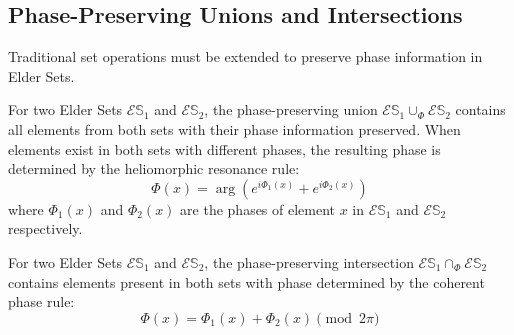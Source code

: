 \subsection{Phase-Preserving Unions and Intersections}

Traditional set operations must be extended to preserve phase information in Elder Sets.

\begin{definition}
For two Elder Sets $\mathcal{E}\mathbb{S}_1$ and $\mathcal{E}\mathbb{S}_2$, the phase-preserving union $\mathcal{E}\mathbb{S}_1 \cup_{\Phi} \mathcal{E}\mathbb{S}_2$ contains all elements from both sets with their phase information preserved. When elements exist in both sets with different phases, the resulting phase is determined by the heliomorphic resonance rule:
\begin{equation}
\Phi(x) = \arg\left(e^{i\Phi_1(x)} + e^{i\Phi_2(x)}\right)
\end{equation}
where $\Phi_1(x)$ and $\Phi_2(x)$ are the phases of element $x$ in $\mathcal{E}\mathbb{S}_1$ and $\mathcal{E}\mathbb{S}_2$ respectively.
\end{definition}

\begin{definition}
For two Elder Sets $\mathcal{E}\mathbb{S}_1$ and $\mathcal{E}\mathbb{S}_2$, the phase-preserving intersection $\mathcal{E}\mathbb{S}_1 \cap_{\Phi} \mathcal{E}\mathbb{S}_2$ contains elements present in both sets with phase determined by the coherent phase rule:
\begin{equation}
\Phi(x) = \Phi_1(x) + \Phi_2(x) \pmod{2\pi}
\end{equation}
\end{definition}

